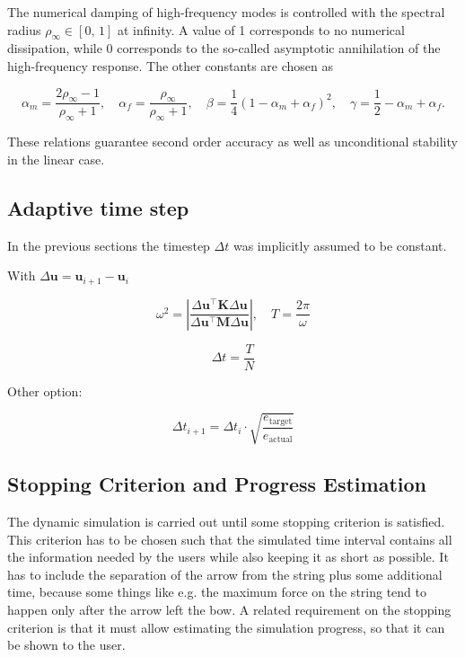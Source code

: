 The numerical damping of high-frequency modes is controlled with the spectral radius $\rho_{\infty} \in [0,\,1]$ at infinity.
A value of 1 corresponds to no numerical dissipation, while 0 corresponds to the so-called asymptotic annihilation of the high-frequency response.
The other constants are chosen as

\begin{equation}
\alpha_m = \frac{2\rho_{\infty} - 1}{\rho_{\infty} + 1},\quad \alpha_f = \frac{\rho_{\infty}}{\rho_{\infty} + 1},\quad \beta = \frac{1}{4}\left(1 - \alpha_m + \alpha_f\right)^2,\quad \gamma = \frac{1}{2} - \alpha_m + \alpha_f.
\end{equation}

These relations guarantee second order accuracy as well as unconditional stability in the linear case.

\newpage
\subsection{Adaptive time step}

In the previous sections the timestep $\Delta t$ was implicitly assumed to be constant.

\cite{bib:hulbert1995}

With $\Delta \boldsymbol{u} = \boldsymbol{u}_{i+1} - \boldsymbol{u}_{i}$

\begin{equation}
\omega^2 = \left\vert \frac{\Delta \boldsymbol{u}^\intercal \boldsymbol{K} \Delta \boldsymbol{u}}{\Delta \boldsymbol{u}^\intercal   \boldsymbol{M} \Delta \boldsymbol{u}} \right\vert, \quad T = \frac{2\pi}{\omega}
\end{equation}

\begin{equation}
\Delta t = \frac{T}{N}
\end{equation}

Other option:

\begin{equation}
\Delta t_{i+1} = \Delta t_{i} \cdot \sqrt{\frac{e_{\mathrm{target}}}{e_{\mathrm{actual}}}}
\end{equation}




\newpage
\subsection{Stopping Criterion and Progress Estimation}

The dynamic simulation is carried out until some stopping criterion is satisfied.
This criterion has to be chosen such that the simulated time interval contains all the information needed by the users while also keeping it as short as possible.
It has to include the separation of the arrow from the string plus some additional time, because some things like e.g. the maximum force on the string tend to happen only after the arrow left the bow.
A related requirement on the stopping criterion is that it must allow estimating the simulation progress, so that it can be shown to the user.

